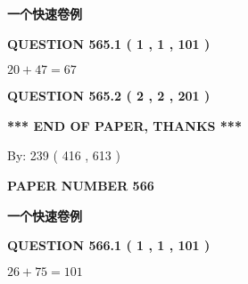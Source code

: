 \documentclass{ctexart}
\begin{document}
   
   
   
   
   
 \vspace{0.2in}
{\LARGE {\textbf{ 一个快速卷例}}}
   
   
  
\vspace{0.2in}
  
{\textbf{\Large{QUESTION
565.1 
 ( 1 , 1 , 101 )
}}}
  
  
 
 

$ %
20 +  %
47=   %
67$
 
 
  
\vspace{0.2in}
  
{\textbf{\Large{QUESTION
565.2 
 ( 2 , 2 , 201 )
}}}
  
  
   
   
 \vspace{0.2in}
 
   
   
   
   
\vspace{1.0in} 
{\textbf{\large{ *** END OF PAPER, THANKS *** }}} 
   
   
\hspace{1.0in} By: 
 239 ( 416 ,  613 )
   
   
   
   
\newpage 
\setcounter{page}{ 
   566001 } 
   
   
   
   
 {\textbf{ \Large{ PAPER NUMBER  566  }}}
   
   
\vspace{0.2in}
   
   
   
   
   
   
 \vspace{0.2in}
{\LARGE {\textbf{ 一个快速卷例}}}
   
   
  
\vspace{0.2in}
  
{\textbf{\Large{QUESTION
566.1 
 ( 1 , 1 , 101 )
}}}
  
  
 
 

$ %
26 +  %
75=   %
101$
 
\end{document}
